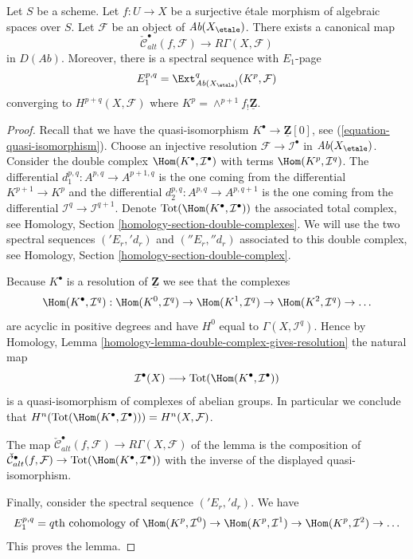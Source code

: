 \begin{lemma}
\label{lemma-alternating-cech-to-cohomology}
Let $S$ be a scheme. Let $f : U \to X$ be a surjective \'etale morphism
of algebraic spaces over $S$. Let $\mathcal{F}$ be an object of
$\textit{Ab}(X_\etale)$. There exists a canonical map
$$
\check{\mathcal{C}}^\bullet_{alt}(f, \mathcal{F})
\longrightarrow
R\Gamma(X, \mathcal{F})
$$
in $D(\textit{Ab})$. Moreover, there is a spectral sequence with $E_1$-page
$$
E_1^{p, q} =
\Ext_{\textit{Ab}(X_\etale)}^q(K^p, \mathcal{F})
$$
converging to $H^{p + q}(X, \mathcal{F})$ where
$K^p = \wedge^{p + 1}f_!\underline{\mathbf{Z}}$.
\end{lemma}

\begin{proof}
Recall that we have the quasi-isomorphism
$K^\bullet \to \underline{\mathbf{Z}}[0]$, see
(\ref{equation-quasi-isomorphism}).
Choose an injective resolution $\mathcal{F} \to \mathcal{I}^\bullet$
in $\textit{Ab}(X_\etale)$. Consider the double complex
$\Hom(K^\bullet, \mathcal{I}^\bullet)$ with terms
$\Hom(K^p, \mathcal{I}^q)$. The differential
$d_1^{p, q} : A^{p, q} \to A^{p + 1, q}$
is the one coming from the differential $K^{p + 1} \to K^p$
and the differential $d_2^{p, q} : A^{p, q} \to A^{p, q + 1}$ is the
one coming from the differential
$\mathcal{I}^q \to \mathcal{I}^{q + 1}$.
Denote $\text{Tot}(\Hom(K^\bullet, \mathcal{I}^\bullet))$
the associated total complex, see
Homology, Section \ref{homology-section-double-complexes}.
We will use the two spectral
sequences $({}'E_r, {}'d_r)$ and $({}''E_r, {}''d_r)$
associated to this double complex, see
Homology, Section \ref{homology-section-double-complex}.

\medskip\noindent
Because $K^\bullet$ is a resolution of $\underline{\mathbf{Z}}$
we see that the complexes
$$
\Hom(K^\bullet, \mathcal{I}^q) :
\Hom(K^0, \mathcal{I}^q) \to
\Hom(K^1, \mathcal{I}^q) \to
\Hom(K^2, \mathcal{I}^q) \to \ldots
$$
are acyclic in positive degrees and have $H^0$ equal to
$\Gamma(X, \mathcal{I}^q)$. Hence by
Homology, Lemma \ref{homology-lemma-double-complex-gives-resolution}
the natural map
$$
\mathcal{I}^\bullet(X) \longrightarrow
\text{Tot}(\Hom(K^\bullet, \mathcal{I}^\bullet))
$$
is a quasi-isomorphism of complexes of abelian groups. In particular
we conclude that
$H^n(\text{Tot}(\Hom(K^\bullet, \mathcal{I}^\bullet))) = H^n(X, \mathcal{F})$.

\medskip\noindent
The map $\check{\mathcal{C}}^\bullet_{alt}(f, \mathcal{F}) \to
R\Gamma(X, \mathcal{F})$ of the lemma is the composition of
$\check{\mathcal{C}}^\bullet_{alt}(f, \mathcal{F}) \to
\text{Tot}(\Hom(K^\bullet, \mathcal{I}^\bullet))$
with the inverse of the displayed quasi-isomorphism.

\medskip\noindent
Finally, consider the spectral sequence $({}'E_r, {}'d_r)$.
We have
$$
E_1^{p, q} = q\text{th cohomology of }
\Hom(K^p, \mathcal{I}^0) \to
\Hom(K^p, \mathcal{I}^1) \to
\Hom(K^p, \mathcal{I}^2) \to \ldots
$$
This proves the lemma.
\end{proof}

